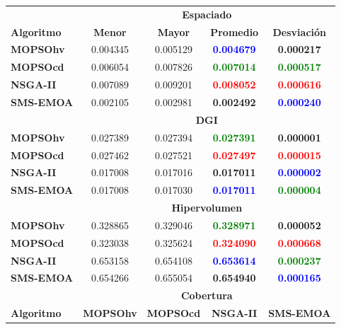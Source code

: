  \begin{table}
 \begin{center}
  \begin{tabular}{|l|cc|cc|} \hline
    & \multicolumn{4}{|c|}{\textbf{Espaciado}} \\ 
	\textbf{Algoritmo} & \textbf{Menor} & \textbf{Mayor} & \textbf{Promedio} & \textbf{Desviaci\'on} \\  \hline\hline
	\textbf{MOPSOhv} &0.004345 & 0.005129 &\textbf{\textcolor{blue}{ 0.004679}}  &\textbf{ 0.000217} \\ 
	\textbf{MOPSOcd} &0.006054 & 0.007826 &\textbf{\textcolor{green}{ 0.007014}} &\textbf{\textcolor{green}{ 0.000517}}  \\ 
	\textbf{NSGA-II} &0.007089 & 0.009201 &\textbf{\textcolor{red}{ 0.008052}}   &\textbf{\textcolor{red}{ 0.000616}}  \\  
	\textbf{SMS-EMOA}&0.002105 & 0.002981 & \textbf{0.002492} &\textbf{\textcolor{blue}{ 0.000240}}\\  
	\hline\hline
    & \multicolumn{4}{|c|}{\textbf{DGI}} \\ 	\hline \hline
	\textbf{MOPSOhv} &0.027389 & 0.027394 & \textbf{\textcolor{green}{0.027391}} &\textbf{0.000001}   \\ 
	\textbf{MOPSOcd} &0.027462 & 0.027521 & \textbf{\textcolor{red}{0.027497}} & \textbf{\textcolor{red}{0.000015}}  \\ 
	\textbf{NSGA-II} &0.017008 & 0.017016 & \textbf{0.017011} & \textbf{\textcolor{blue}{0.000002}}   \\  
	\textbf{SMS-EMOA}&0.017008 & 0.017030 & \textbf{\textcolor{blue}{0.017011}} & \textbf{\textcolor{green}{0.000004}}  \\  
	\hline\hline
    & \multicolumn{4}{|c|}{\textbf{Hipervolumen}} \\ 	\hline \hline
	\textbf{MOPSOhv} &0.328865 & 0.329046 & \textbf{\textcolor{green}{0.328971}} & \textbf{0.000052}  \\ 
	\textbf{MOPSOcd} &0.323038 & 0.325624 & \textbf{\textcolor{red}{0.324090}} & \textbf{\textcolor{red}{0.000668}}  \\ 
	\textbf{NSGA-II} &0.653158 & 0.654108 & \textbf{\textcolor{blue}{0.653614}} & \textbf{\textcolor{green}{0.000237}}  \\  
	\textbf{SMS-EMOA}&0.654266 & 0.655054 & \textbf{0.654940} & \textbf{\textcolor{blue}{0.000165}}  \\  
	\hline
    & \multicolumn{4}{|c|}{\textbf{Cobertura}} \\ \hline\hline 
	\textbf{Algoritmo} & \textbf{MOPSOhv} & \textbf{MOPSOcd} & \textbf{NSGA-II} & \textbf{SMS-EMOA} \\  \hline \hline

\end{tabular}
\end{center}
\end{table}
